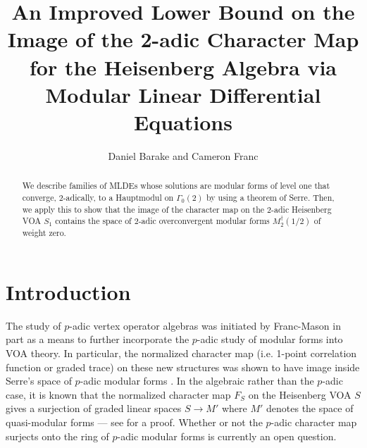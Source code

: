 \documentclass[10pt,a4paper]{amsart}
\numberwithin{equation}{section}
\theoremstyle{definition}
\newcommand{\Heis}{S}
\begin{document}
\title[Image of the 2-adic Character Map via MLDEs]{An Improved Lower Bound on the Image of the 2-adic Character Map for the Heisenberg Algebra via Modular Linear Differential Equations}

\author{Daniel Barake and Cameron Franc}

\begin{abstract}
We describe families of MLDEs whose solutions are modular forms of level one that converge, $2$-adically, to a Hauptmodul on $\Gamma_0(2)$ by using a theorem of Serre. Then, we apply this to show that the image of the character map on the $2$-adic Heisenberg VOA $S_{1}$ contains the space of $2$-adic overconvergent modular forms $M_{2}^{\dagger}(1/2)$ of weight zero.
\end{abstract}

\maketitle

\section{Introduction}

The study of $p$-adic vertex operator algebras was initiated by Franc-Mason \cite{FM23} in part as a means to further incorporate the $p$-adic study of modular forms into VOA theory. In particular, the normalized character map (i.e. 1-point correlation function or graded trace) on these new structures was shown to have image inside Serre's space of $p$-adic modular forms \cite{pSerre}. In the algebraic rather than the $p$-adic case, it is known that the normalized character map $F_{\Heis}$ on the Heisenberg VOA $\Heis$ gives a surjection of graded linear spaces $\Heis \to M'$ where $M'$ denotes the space of quasi-modular forms --- see \cite{MT} for a proof. Whether or not the $p$-adic character map surjects onto the ring of $p$-adic modular forms is currently an open question. 
\end{document}
